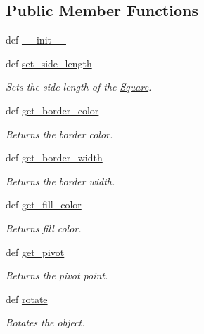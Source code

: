 \subsection*{Public Member Functions}
\begin{DoxyCompactItemize}
\item 
def \hyperlink{classcs110graphics_1_1Square_ae4b847029070a73478fd7dd2eefeb58e}{\_\-\_\-init\_\-\_\-}
\item 
def \hyperlink{classcs110graphics_1_1Square_a4b650f9ef28d4fab88d36ce65e8e0cf1}{set\_\-side\_\-length}
\begin{DoxyCompactList}\small\item\em Sets the side length of the \hyperlink{classcs110graphics_1_1Square}{Square}. \item\end{DoxyCompactList}\item 
def \hyperlink{classcs110graphics_1_1Fillable_a6772d56158c9fe98a33f01d47cb8aa41}{get\_\-border\_\-color}
\begin{DoxyCompactList}\small\item\em Returns the border color. \item\end{DoxyCompactList}\item 
def \hyperlink{classcs110graphics_1_1Fillable_a6ed7a4288e84a090ec185c8bdff21d0f}{get\_\-border\_\-width}
\begin{DoxyCompactList}\small\item\em Returns the border width. \item\end{DoxyCompactList}\item 
def \hyperlink{classcs110graphics_1_1Fillable_a16c045bc9b63961b696914ee1a1d14d9}{get\_\-fill\_\-color}
\begin{DoxyCompactList}\small\item\em Returns fill color. \item\end{DoxyCompactList}\item 
def \hyperlink{classcs110graphics_1_1Fillable_a514fa0d21297c1372681afae9219fd58}{get\_\-pivot}
\begin{DoxyCompactList}\small\item\em Returns the pivot point. \item\end{DoxyCompactList}\item 
def \hyperlink{classcs110graphics_1_1Fillable_afa6710f6c314de39d19f06d9dd306d7d}{rotate}
\begin{DoxyCompactList}\small\item\em Rotates the object. \item\end{DoxyCompactList}\item 

\end{DoxyCompactItemize}
